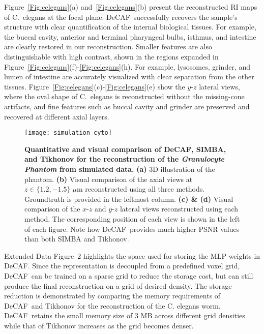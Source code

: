 \documentclass[11pt]{article}
\theoremstyle{plain} %
\def\proposed{DeCAF}
\begin{document}
Figure~\ref{Fig:celegans}(a) and~\ref{Fig:celegans}(b) present the reconstructed RI maps of C.\ elegans at the focal plane. 
\proposed~successfully recovers the sample's structure with clear quantification of the internal biological tissues. For example, the buccal cavity, anterior and terminal pharyngeal bulbs, isthmus, and intestine are clearly restored in our reconstruction. 
Smaller features are also distinguishable with high contrast, shown in the regions expanded in Figure~\ref{Fig:celegans}(f)-\ref{Fig:celegans}(h). 
For example, lysosomes, grinder, and lumen of intestine are accurately visualized with clear separation from the other tissues.
Figure~\ref{Fig:celegans}(c)-\ref{Fig:celegans}(e) show the $y$-$z$ lateral views, where the oval shape of C.\ elegans is reconstructed without the missing-cone artifacts, and fine features such as buccal cavity and grinder are preserved and recovered at different axial layers.

\begin{figure}[t!]
\begin{center}
\texttt{[image: simulation\_cyto]}
\end{center}
\caption{
\textbf{Quantitative and visual comparison of \proposed, SIMBA, and Tikhonov for the reconstruction of the \emph{Granulocyte Phantom} from simulated data.} 
\textbf{(a)} 3D illustration of the phantom. 
\textbf{(b)} Visual comparison of the axial views at $z\in\{1.2, -1.5\}\;\mu$m reconstructed using all three methods. Groundtruth is provided in the leftmost column.
\textbf{(c) \& (d)} Visual comparison of the $x$-$z$ and $y$-$z$ lateral views reconstructed using each method. The corresponding position of each view is shown in the left of each figure.
Note how \proposed~provides much higher PSNR values than both SIMBA and Tikhonov.
}
\label{Fig:Granulocyte}
\end{figure}

Extended Data Figure~2 highlights the space used for storing the MLP weights in \proposed.
Since the representation is decoupled from a predefined voxel grid, \proposed~can be trained on a sparse grid to reduce the storage cost, but can still produce the final reconstruction on a grid of desired density. The storage reduction is demonstrated by comparing the memory requirements of \proposed~and Tikhonov for the reconstruction of the C. elegans worm. \proposed~retains the small memory size of $3$ MB across different grid densities while that of Tikhonov increases as the grid becomes denser.
\end{document}
